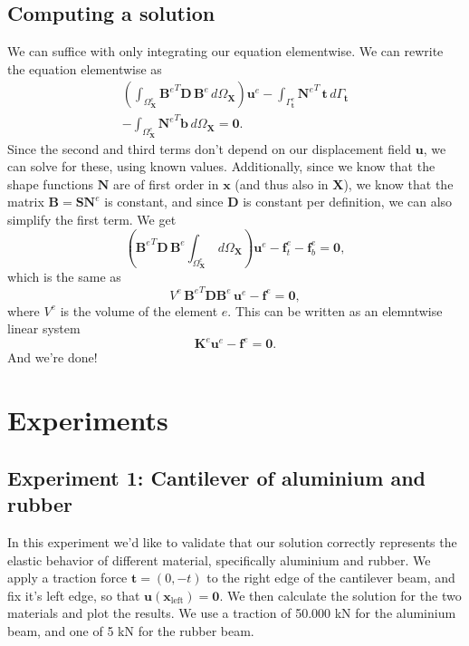 \documentclass[acmtog]{acmart}
\begin{document}
\subsection{Computing a solution}
We can suffice with only integrating our equation elementwise. We can rewrite the equation elementwise as
%
\begin{multline}
  \left( \int_{\Omega_{\boldsymbol X}^e} {\boldsymbol B^e}^T \boldsymbol D \, \boldsymbol B^e \, d\Omega_{\boldsymbol X} \right) \boldsymbol u^e
  - \int_{\Gamma_{\boldsymbol t}^e} {\boldsymbol N^e}^T  \, \boldsymbol t \, d\Gamma_{\boldsymbol t} \\
  - \int_{\Omega_{\boldsymbol X}^e} {\boldsymbol N^e}^T \boldsymbol b \, d\Omega_{\boldsymbol X} = \boldsymbol 0.
\end{multline}
%
Since the second and third terms don't depend on our displacement field $\boldsymbol u$, we can solve for these, using known values. Additionally, since we know that the shape functions $\boldsymbol N$ are of first order in $\boldsymbol x$ (and thus also in $\boldsymbol X$), we know that the matrix $\boldsymbol B = \boldsymbol S \boldsymbol N^e$ is constant, and since $\boldsymbol D$ is constant per definition, we can also simplify the first term. We get
%
\begin{equation}
  \left( {\boldsymbol B^e}^T \boldsymbol D \, \boldsymbol B^e \int_{\Omega_{\boldsymbol X}^e} \, d\Omega_{\boldsymbol X} \right) \boldsymbol u^e - \mathbf f_t^e - \mathbf f_b^e  = \boldsymbol 0,
\end{equation}
%
which is the same as
%
\begin{equation}
  V^e \, {\boldsymbol B^e}^T \boldsymbol D \boldsymbol B^e \,\boldsymbol u^e - \mathbf f ^e = \boldsymbol 0,
\end{equation}
%
where $V^e$ is the volume of the element $e$. This can be written as an elemntwise linear system
%
\begin{equation}
  \boldsymbol K^e \boldsymbol u^e - \mathbf f^e = \boldsymbol 0.
\end{equation}
%
And we're done!

\section{Experiments}

\subsection{Experiment 1: Cantilever of aluminium and rubber}
In this experiment we'd like to validate that our solution correctly represents the elastic behavior of different material, specifically aluminium and rubber. We apply a traction force $\boldsymbol t = (0, -t)$ to the right edge of the cantilever beam, and fix it's left edge, so that $\boldsymbol u(\boldsymbol x_\mathrm{left} ) = \boldsymbol 0$. We then calculate the solution for the two materials and plot the results. We use a traction of 50.000 kN for the aluminium beam, and one of 5 kN for the rubber beam.
\end{document}

